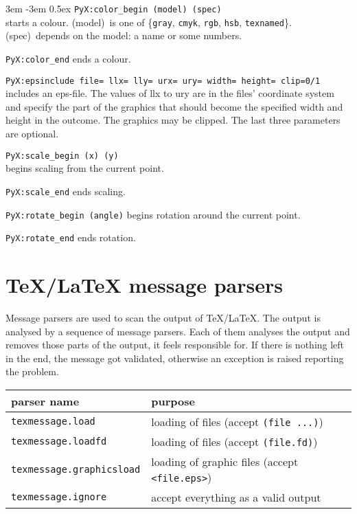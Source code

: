 \begingroup
\leftskip3em
\parindent-3em
\parskip0.5ex
\texttt{PyX:color\_begin (model) (spec)}\\
  starts a colour. (model)~is one of
  \{\verb|gray|, \verb|cmyk|, \verb|rgb|, \verb|hsb|, \verb|texnamed|\}.
  (spec)~depends on the model: a name or some numbers.\par
\texttt{PyX:color\_end} ends a colour.\par
\texttt{PyX:epsinclude file= llx= lly= urx= ury= width= height= clip=0/1}\\
  includes an eps-file. The values of llx to ury are in the files' coordinate
  system and specify the part of the graphics that should become the specified
  width and height in the outcome. The graphics may be clipped. The last three
  parameters are optional.\par
\texttt{PyX:scale\_begin (x) (y)}\\
  begins scaling from the current point.\par
\texttt{PyX:scale\_end} ends scaling.\par
\texttt{PyX:rotate\_begin (angle)} begins rotation around the current
  point.\par
\texttt{PyX:rotate\_end} ends rotation.\par
\endgroup


\section[TeX/LaTeX message parsers]{\TeX/\LaTeX{} message parsers}

Message parsers are used to scan the output of \TeX/\LaTeX. The output
is analysed by a sequence of message parsers. Each of them analyses
the output and removes those parts of the output, it feels responsible
for. If there is nothing left in the end, the message got validated,
otherwise an exception is raised reporting the problem.

\medskip
\begin{tabular}{ll}
parser name&purpose\\
\hline
\texttt{texmessage.load}&loading of files (accept \texttt{(file ...)})\\
\texttt{texmessage.loadfd}&loading of files (accept \texttt{(file.fd)})\\
\texttt{texmessage.graphicsload}&loading of graphic files (accept \texttt{<file.eps>})\\
\texttt{texmessage.ignore}&accept everything as a valid output\\
\end{tabular}
\medskip

